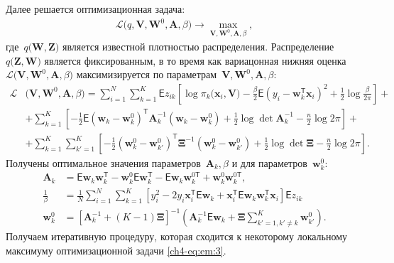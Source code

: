 \documentclass{dissert}
\begin{document}
Далее решается оптимизационная задача:
\[
\label{ch4-eq:em:new:3}
\begin{aligned}
\mathcal{L}\bigr(q, \textbf{V}, \textbf{W}^{0}, \textbf{A}, \beta\bigr) \to \max_{\textbf{V}, \textbf{W}^{0}, \textbf{A}, \beta},
\end{aligned}
\]
где~$q\bigr(\textbf{W}, \textbf{Z}\bigr)$ является известной плотностью распределения.
Распределение~$q\bigr(\mathbf{Z}, \mathbf{W}\bigr)$ является фиксированным, в то время как вариацонная нижняя оценка~$\mathcal{L}\bigr(\textbf{V}, \textbf{W}^{0}, \textbf{A}, \beta\bigr)$ максимизируется по параметрам~$\mathbf{V}, \mathbf{W}^0, \textbf{A},  \beta$:
\[
\label{ch4-eq:em:7}
\begin{aligned}
\mathcal{L}&\bigr(\textbf{V}, \textbf{W}^{0}, \textbf{A}, \beta\bigr) = \sum_{i=1}^{N}\sum_{k=1}^{K}\mathsf{E}z_{ik}\left[\log\pi_k\bigr(\textbf{x}_i, \textbf{V}\bigr) - \frac{\beta}{2}\mathsf{E}\left(y_{i} - \textbf{w}_{k}^{\mathsf{T}}\textbf{x}_{i}\right)^{2} + \frac{1}{2}\log\frac{\beta}{2\pi}\right] +\\
&+ \sum_{k=1}^{K}\left[-\frac{1}{2}\mathsf{E}\left(\textbf{w}_{k} - \textbf{w}_{k}^{0}\right)^{\mathsf{T}}\textbf{A}_{k}^{-1}\left(\textbf{w}_{k} - \textbf{w}_{k}^{0}\right) + \frac{1}{2}\log\det\textbf{A}^{-1}_{k} - \frac{n}{2}\log2\pi\right] +\\
&+ \sum_{k=1}^{K}\sum_{k'=1}^{K}\left[-\frac{1}{2}\left(\textbf{w}_{k}^{0}-\textbf{w}_{k'}^{0}\right)^{\mathsf{T}}\bm{\Xi}^{-1}\left(\textbf{w}_{k}^{0}-\textbf{w}_{k'}^{0}\right) +\frac{1}{2}\log\det\bm{\Xi} -\frac{n}{2}\log{2\pi}\right].
\end{aligned}
\]
Получены оптимальное значения параметров~$\textbf{A}_{k}, \beta$ и для параметров~$\textbf{w}_{k}^{0}:$
\[
\label{ch4-eq:em:9}
\begin{aligned}
\textbf{A}_{k} &= \mathsf{E}\textbf{w}_{k}\textbf{w}_{k}^{\mathsf{T}} - \textbf{w}_{k}^{0}\mathsf{E}\textbf{w}_{k}^{\mathsf{T}} - \mathsf{E}\textbf{w}_{k}\textbf{w}_{k}^{0\mathsf{T}} + \textbf{w}_{k}^{0}\textbf{w}_{k}^{0\mathsf{T}},\\
\frac{1}{\beta} &= \frac{1}{N}\sum_{i=1}^{N}\sum_{k=1}^{K}\left[y_{i}^{2}-2y_{i}\textbf{x}_{i}^{\mathsf{T}}\mathsf{E}\textbf{w}_{k} + \textbf{x}_{i}^{\mathsf{T}}\mathsf{E}\textbf{w}_{k}\textbf{w}_{k}^{\mathsf{T}}\textbf{x}_{i}\right]\mathsf{E}z_{ik}\\
\textbf{w}_{k}^{0} &= \left[\textbf{A}_{k}^{-1}+\left(K-1\right)\bm{\Xi}\right]^{-1}\left(\textbf{A}^{-1}_{k}\mathsf{E}\textbf{w}_{k}+\bm{\Xi}\sum_{k'=1, k'\not=k}^{K}\textbf{w}_{k'}^{0}\right).
\end{aligned}
\]
Получаем итеративную процедуру, которая сходится к некоторому локальному максимуму оптимизационной задачи \eqref{ch4-eq:em:3}.
\end{document}
